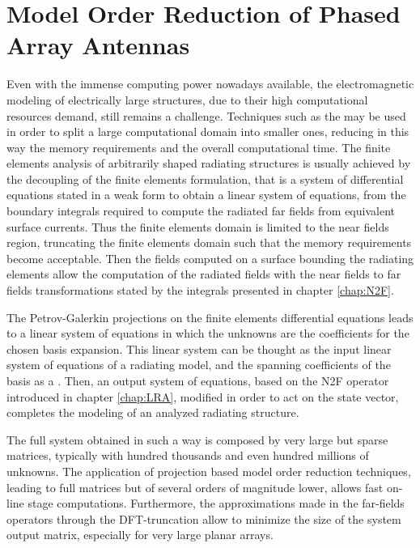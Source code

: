 \graphicspath{{img/ch3/}}
\cleardoublepage
\chapter{Model Order Reduction of Phased Array Antennas} \label{chap:MOR}

\par Even with the immense computing power nowadays available, the electromagnetic modeling of electrically large structures, due to their high computational resources demand, still remains a challenge. Techniques such as the  \cite{GuarnieriSelleriFEDD, SelleriEdlingerDDMOR} may be used in order to split a large computational domain into smaller ones, reducing in this way the memory requirements and the overall computational time. The finite elements analysis of arbitrarily shaped radiating structures is usually achieved by the decoupling of the finite elements formulation, that is a system of differential equations stated in a weak form to obtain a linear system of equations, from the boundary integrals required to compute the radiated far fields from equivalent surface currents. Thus the finite elements domain is limited to the near fields region, truncating the finite elements domain such that the memory requirements become acceptable. Then the fields computed on a surface bounding the radiating elements allow the computation of the radiated fields with the near fields to far fields transformations stated by the integrals presented in chapter \ref{chap:N2F}.

\par The Petrov-Galerkin projections \cite{ThomeeGFEMP} on the finite elements differential equations leads to a linear system of equations in which the unknowns are the coefficients for the chosen basis expansion. This linear system can be thought as the input linear system of equations of a radiating model, and the spanning coefficients of the basis as a . Then, an output system of equations, based on the N2F operator introduced in chapter \ref{chap:LRA},  modified in order to act on the state vector, completes the modeling of an analyzed radiating structure.

\par The full system obtained in such a way is composed by very large but sparse matrices, typically with hundred thousands and even hundred millions of unknowns. The application of projection based model order reduction techniques, leading to full matrices but of several orders of magnitude lower, allows fast on-line stage computations. Furthermore, the approximations made in the far-fields operators through the DFT-truncation allow to minimize the size of the system output matrix, especially for very large planar arrays.

